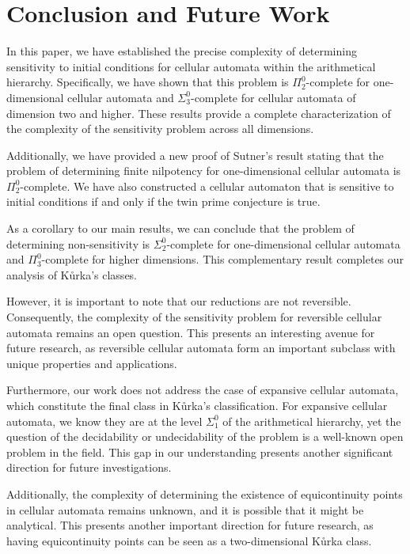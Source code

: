 \documentclass{llncs}
\begin{document}
\section{Conclusion and Future Work}

In this paper, we have established the precise complexity of determining sensitivity to initial conditions for cellular automata within the arithmetical hierarchy. Specifically, we have shown that this problem is $\Pi^0_2$-complete for one-dimensional cellular automata and $\Sigma^0_3$-complete for cellular automata of dimension two and higher. These results provide a complete characterization of the complexity of the sensitivity problem across all dimensions.

Additionally, we have provided a new proof of Sutner's result stating that the problem of determining finite nilpotency for one-dimensional cellular automata is $\Pi^0_2$-complete. We have also constructed a cellular automaton that is sensitive to initial conditions if and only if the twin prime conjecture is true.

As a corollary to our main results, we can conclude that the problem of determining non-sensitivity is $\Sigma^0_2$-complete for one-dimensional cellular automata and $\Pi^0_3$-complete for higher dimensions. This complementary result completes our analysis of K{\r{u}}rka's classes.

However, it is important to note that our reductions are not reversible. Consequently, the complexity of the sensitivity problem for reversible cellular automata remains an open question. This presents an interesting avenue for future research, as reversible cellular automata form an important subclass with unique properties and applications.

Furthermore, our work does not address the case of expansive cellular automata, which constitute the final class in K{\r{u}}rka's classification. For expansive cellular automata, we know they are at the level $\Sigma^0_1$ of the arithmetical hierarchy, yet the question of the decidability or undecidability of the problem is a well-known open problem in the field. This gap in our understanding presents another significant direction for future investigations.

Additionally, the complexity of determining the existence of equicontinuity points in cellular automata remains unknown, and it is possible that it might be analytical. This presents another important direction for future research, as having equicontinuity points can be seen as a two-dimensional K{\r{u}}rka class.
\end{document}

